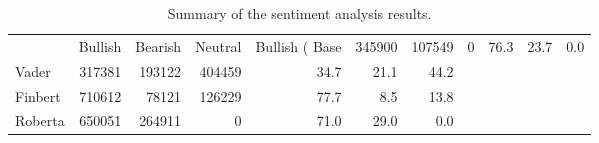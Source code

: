 \begin{table}
\caption{Summary of the sentiment analysis results.}
\label{tbl:sentiment_summary}
\begin{tabular}{lrrrrrr}
\toprule
 & Bullish & Bearish & Neutral & Bullish (%
\midrule
Base & 345900 & 107549 & 0 & 76.3 & 23.7 & 0.0 \\
Vader & 317381 & 193122 & 404459 & 34.7 & 21.1 & 44.2 \\
Finbert & 710612 & 78121 & 126229 & 77.7 & 8.5 & 13.8 \\
Roberta & 650051 & 264911 & 0 & 71.0 & 29.0 & 0.0 \\
\bottomrule
\end{tabular}
\end{table}
